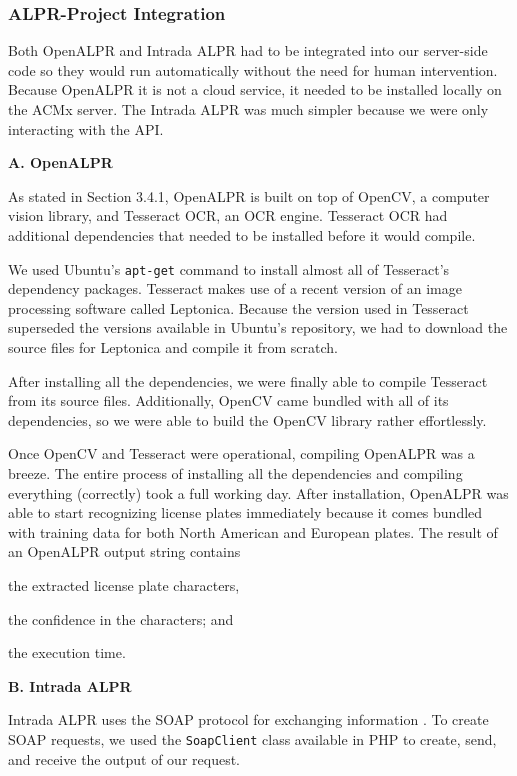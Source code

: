 \documentclass[11pt, oneside, fullpage, doublespace]{article}
\begin{document}
\subsubsection{ALPR-Project Integration}
Both OpenALPR and Intrada ALPR had to be integrated into our server-side code so they would run automatically without the need for human intervention. Because OpenALPR it is not a cloud service, it needed to be installed locally on the ACMx server. The Intrada ALPR was much simpler because we were only interacting with the API.

\textbf{A. OpenALPR}

As stated in Section 3.4.1, OpenALPR is built on top of OpenCV, a computer vision library, and Tesseract OCR, an OCR engine. Tesseract OCR had additional dependencies that needed to be installed before it would compile.

We used Ubuntu's \verb+apt-get+ command to install almost all of Tesseract's dependency packages. Tesseract makes use of a recent version of an image processing software called Leptonica. Because the version used in Tesseract superseded the versions available in Ubuntu's repository, we had to download the source files for Leptonica and compile it from scratch.

After installing all the dependencies, we were finally able to compile Tesseract from its source files. Additionally, OpenCV came bundled with all of its dependencies, so we were able to build the OpenCV library rather effortlessly.

Once OpenCV and Tesseract were operational, compiling OpenALPR was a breeze. The entire process of installing all the dependencies and compiling everything (correctly) took a full working day. After installation, OpenALPR was able to start recognizing license plates immediately because it comes bundled with training data for both North American and European plates. The result of an OpenALPR output string contains
\begin{inparaenum}
\item the extracted license plate characters,
\item the confidence in the characters; and
\item the execution time.
\end{inparaenum}

\textbf{B. Intrada ALPR}

Intrada ALPR uses the SOAP protocol for exchanging information \cite{soapw3c}. To create SOAP requests, we used the \verb+SoapClient+ class available in PHP to create, send, and receive the output of our request.
\end{document}
